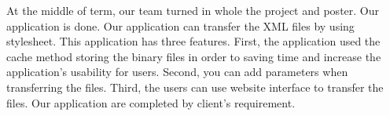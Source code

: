 At the middle of term, our team turned in whole the project and poster.
Our application is done.
Our application can transfer the XML files by using stylesheet. 
This application has three features.
First, the application used the cache method storing the binary files in order to saving time and increase the application's usability for users.
Second, you can add parameters when transferring the files.
Third, the users can use website interface to transfer the files. 
Our application are completed by client's requirement. 
